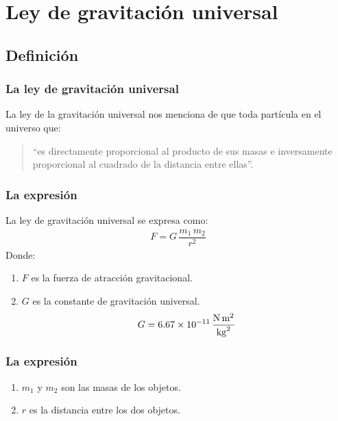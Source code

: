 \documentclass[14pt]{beamer}
\begin{document}
\section{Ley de gravitación universal}
\subsection{Definición}

\begin{frame}
\frametitle{La ley de gravitación universal}
La ley de la gravitación universal nos menciona de que toda partícula en el universo  que:
\pause
\begin{quote}
“es directamente proporcional al producto de sus masas e inversamente proporcional al cuadrado de la distancia entre ellas”.
\end{quote}
\end{frame}
\begin{frame}
\frametitle{La expresión}
\vspace*{-1cm}
La ley de gravitación universal se expresa como:
\pause
\begin{align*}
F = G \, \dfrac{m_{1} \, m_{2}}{r^{2}}
\end{align*}
Donde:
\pause
{}
\begin{enumerate}[<+->]
\item $F$ es la fuerza de atracción gravitacional.
\item $G$ es la constante de gravitación universal.
\begin{align*}
G = \SI[per-mode=fraction]{6.67d-11}{\newton\square\meter\per\square\kilo\gram}
\end{align*}
\seti
\end{enumerate}
\end{frame}
\begin{frame}
\frametitle{La expresión}
\begin{enumerate}[<+->]    
\conti
\item $m_{1}$ y $m_{2}$ son las masas de los objetos.
\item $r$ es la distancia entre los dos objetos.
\end{enumerate}
\end{frame}
\end{document}
